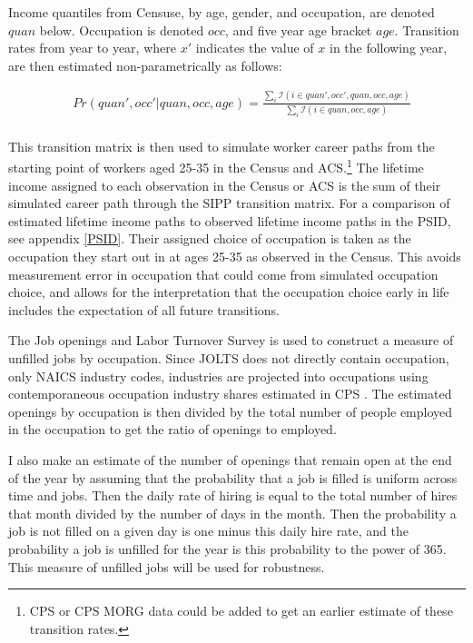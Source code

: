 \documentclass[11pt]{article}
\begin{document}
Income quantiles from Censuse, by age, gender, and occupation, are denoted $quan$ below. Occupation is denoted $occ$, and five year age bracket $age$. Transition rates from year to year, where $x'$ indicates the value of $x$ in the following year, are then estimated non-parametrically as follows:

\begin{align*}
& Pr(quan',occ'|quan,occ,age)=  \frac{\sum_{i} \mathcal{I}(i \in quan',occ',quan,occ,age)}{ \sum_{i} \mathcal{I}(i \in quan,occ,age)}\\
\end{align*}

This transition matrix is then used to simulate worker career paths from the starting point of workers aged 25-35 in the Census and ACS.\footnote{CPS or CPS MORG data could be added to get an earlier estimate of these transition rates.} The lifetime income assigned to each observation in the Census or ACS is the sum of their simulated career path through the SIPP transition matrix. For a comparison of estimated lifetime income paths to observed lifetime income paths in the PSID, see appendix \ref{PSID}. Their assigned choice of occupation is taken as the occupation they start out in at ages 25-35 as observed in the Census. This avoids measurement error in occupation that could come from simulated occupation choice, and allows for the interpretation that the occupation choice early in life includes the expectation of all future transitions.

The Job openings and Labor Turnover Survey \cite{JOLTS} is used to construct a measure of unfilled jobs by occupation. Since JOLTS does not directly contain occupation, only NAICS industry codes, industries are projected into occupations using contemporaneous occupation industry shares estimated in CPS \cite{IPUMSCPS}. The estimated openings by occupation is then divided by the total number of people employed in the occupation to get the ratio of openings to employed.

I also make an estimate of the number of openings that remain open at the end of the year by assuming that the probability that a job is filled is uniform across time and jobs. Then the daily rate of hiring is equal to the total number of hires that month divided by the number of days in the month. Then the probability a job is not filled on a given day is one minus this daily hire rate, and the probability a job is unfilled for the year is this probability to the power of 365. This measure of unfilled jobs will be used for robustness.
\end{document}
